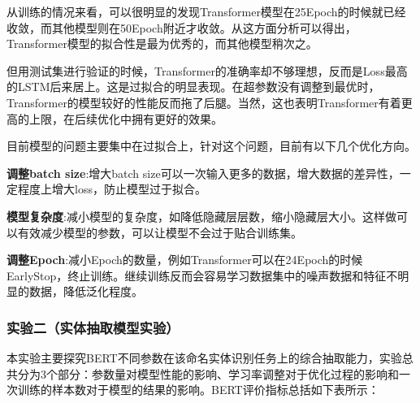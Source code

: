 \documentclass[letterpaper]{article}
\begin{document}
      从训练的情况来看，可以很明显的发现Transformer模型在25Epoch的时候就已经收敛，而其他模型则在50Epoch附近才收敛。从这方面分析可以得出，Transformer模型的拟合性是最为优秀的，而其他模型稍次之。
      
      但用测试集进行验证的时候，Transformer的准确率却不够理想，反而是Loss最高的LSTM后来居上。这是过拟合的明显表现。在超参数没有调整到最优时，Transformer的模型较好的性能反而拖了后腿。当然，这也表明Transformer有着更高的上限，在后续优化中拥有更好的效果。
      
      目前模型的问题主要集中在过拟合上，针对这个问题，目前有以下几个优化方向。
      
      \textbf{调整batch size}:增大batch size可以一次输入更多的数据，增大数据的差异性，一定程度上增大loss，防止模型过于拟合。
      
      \textbf{模型复杂度}:减小模型的复杂度，如降低隐藏层层数，缩小隐藏层大小。这样做可以有效减少模型的参数，可以让模型不会过于贴合训练集。
      
      \textbf{调整Epoch}:减小Epoch的数量，例如Transformer可以在24Epoch的时候EarlyStop，终止训练。继续训练反而会容易学习数据集中的噪声数据和特征不明显的数据，降低泛化程度。

    \subsubsection{实验二（实体抽取模型实验）}
    本实验主要探究BERT不同参数在该命名实体识别任务上的综合抽取能力，实验总共分为3个部分：参数量对模型性能的影响、学习率调整对于优化过程的影响和一次训练的样本数对于模型的结果的影响。BERT评价指标总括如下表所示：
\end{document}
